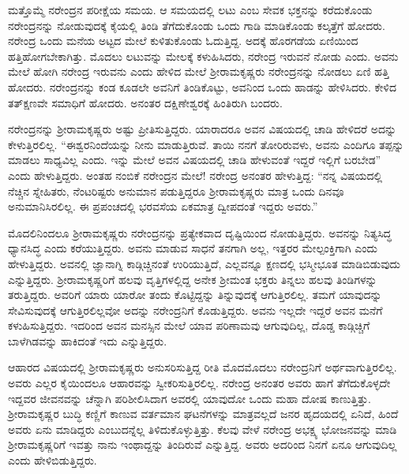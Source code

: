ಮತ್ತೊಮ್ಮೆ ನರೇಂದ್ರನ ಪರೀಕ್ಷೆಯ ಸಮಯ. ಆ ಸಮಯದಲ್ಲಿ ಲಟು ಎಂಬ ಸೇವಕ ಭಕ್ತನನ್ನು ಕರೆದುಕೊಂಡು ನರೇಂದ್ರನನ್ನು ನೋಡುವುದಕ್ಕೆ ಕೈಯಲ್ಲಿ ತಿಂಡಿ ತೆಗೆದುಕೊಂಡು ಒಂದು ಗಾಡಿ ಮಾಡಿಕೊಂಡು ಕಲ್ಕತ್ತೆಗೆ ಹೋದರು. ನರೇಂದ್ರ ಒಂದು ಮನೆಯ ಅಟ್ಟದ ಮೇಲೆ ಕುಳಿತುಕೊಂಡು ಓದುತ್ತಿದ್ದ. ಅದಕ್ಕೆ ಹೊರಗಡೆಯ ಏಣಿಯಿಂದ ಹತ್ತಿಹೋಗಬೇಕಾಗಿತ್ತು. ಮೊದಲು ಲಟುವನ್ನು ಮೇಲಕ್ಕೆ ಕಳುಹಿಸಿದರು, ನರೇಂದ್ರ ಇರುವನೆ ನೋಡು ಎಂದು. ಅವನು ಮೇಲೆ ಹೋಗಿ ನರೇಂದ್ರ ಇರುವನು ಎಂದು ಹೇಳಿದ ಮೇಲೆ ಶ‍್ರೀರಾಮಕೃಷ್ಣರು ನರೇಂದ್ರನನ್ನು ನೋಡಲು ಏಣಿ ಹತ್ತಿ ಹೋದರು. ನರೇಂದ್ರನನ್ನು ಕಂಡ ಕೂಡಲೇ ಅವನಿಗೆ ತಿಂಡಿಕೊಟ್ಟು, ಅವನಿಂದ ಒಂದು ಹಾಡನ್ನು ಹೇಳಿಸಿದರು. ಕೇಳಿದ ತತ್‍ಕ್ಷಣವೇ ಸಮಾಧಿಗೆ ಹೋದರು. ಅನಂತರ ದಕ್ಷಿಣೇಶ್ವರಕ್ಕೆ ಹಿಂತಿರುಗಿ ಬಂದರು.

ನರೇಂದ್ರನನ್ನು ಶ‍್ರೀರಾಮಕೃಷ್ಣರು ಅಷ್ಟು ಪ್ರೀತಿಸುತ್ತಿದ್ದರು. ಯಾರಾದರೂ ಅವನ ವಿಷಯದಲ್ಲಿ ಚಾಡಿ ಹೇಳಿದರೆ ಅದನ್ನು ಕೇಳುತ್ತಿರಲಿಲ್ಲ. “ಈಶ್ವರನಿಂದೆಯನ್ನು ನೀನು ಮಾಡುತ್ತಿರುವೆ. ತಾಯಿ ನನಗೆ ತೋರಿರುವಳು, ಅವನು ಎಂದಿಗೂ ತಪ್ಪನ್ನು ಮಾಡಲು ಸಾಧ್ಯವಿಲ್ಲ ಎಂದು. ಇನ್ನು ಮೇಲೆ ಅವನ ವಿಷಯದಲ್ಲಿ ಚಾಡಿ ಹೇಳುವಂತೆ ಇದ್ದರೆ ಇಲ್ಲಿಗೆ ಬರಬೇಡ” ಎಂದು ಹೇಳುತ್ತಿದ್ದರು. ಅಂತಹ ನಂಬಿಕೆ ನರೇಂದ್ರನ ಮೇಲೆ! ನರೇಂದ್ರ ಅನಂತರ ಹೇಳುತ್ತಿದ್ದ: “ನನ್ನ ವಿಷಯದಲ್ಲಿ ನೆಚ್ಚಿನ ಸ್ನೇಹಿತರು, ನೆಂಟರಿಷ್ಟರು ಅನುಮಾನ ಪಡುತ್ತಿದ್ದರೂ ಶ‍್ರೀರಾಮಕೃಷ್ಣರು ಮಾತ್ರ ಒಂದು ದಿನವೂ ಅನುಮಾನಿಸಿರಲಿಲ್ಲ. ಈ ಪ್ರಪಂಚದಲ್ಲಿ ಭರವಸೆಯ ಏಕಮಾತ್ರ ದ್ವೀಪದಂತೆ ಇದ್ದರು ಅವರು.”

ಮೊದಲಿನಿಂದಲೂ ಶ‍್ರೀರಾಮಕೃಷ್ಣರು ನರೇಂದ್ರನನ್ನು ಪ್ರತ್ಯೇಕವಾದ ದೃಷ್ಟಿಯಿಂದ ನೋಡುತ್ತಿದ್ದರು. ಅವನನ್ನು ನಿತ್ಯಸಿದ್ಧ ಧ್ಯಾನಸಿದ್ಧ ಎಂದು ಕರೆಯುತ್ತಿದ್ದರು. ಅವನು ಮಾಡುವ ಸಾಧನೆ ತನಗಾಗಿ ಅಲ್ಲ, ಇತ್ತರರ ಮೇಲ್ಪಂಕ್ತಿಗಾಗಿ ಎಂದು ಹೇಳುತ್ತಿದ್ದರು. ಅವನಲ್ಲಿ ಜ್ಞಾನಾಗ್ನಿ ಕಾಡ್ಗಿಚ್ಚಿನಂತೆ ಉರಿಯುತ್ತಿದೆ, ಎಲ್ಲವನ್ನೂ ಕ್ಷಣದಲ್ಲಿ ಭಸ್ಮೀಭೂತ ಮಾಡಿಬಿಡುವುದು ಎನ್ನುತ್ತಿದ್ದರು. ಶ‍್ರೀರಾಮಕೃಷ್ಣರಿಗೆ ಹಲವು ವೃತ್ತಿಗಳಲ್ಲಿದ್ದ ಅನೇಕ ಶ‍್ರೀಮಂತ ಭಕ್ತರು ತಿನ್ನಲು ಹಲವು ತಿಂಡಿಗಳನ್ನು ತರುತ್ತಿದ್ದರು. ಅವರಿಗೆ ಯಾರು ಯಾರೋ ತಂದು ಕೊಟ್ಟಿದ್ದನ್ನು ತಿನ್ನುವುದಕ್ಕೆ ಆಗುತ್ತಿರಲಿಲ್ಲ. ತಮಗೆ ಯಾವುದನ್ನು ಸೇವಿಸುವುದಕ್ಕೆ ಆಗುತ್ತಿರಲಿಲ್ಲವೋ ಅದನ್ನು ನರೇಂದ್ರನಿಗೆ ಕೊಡುತ್ತಿದ್ದರು. ಅವನು ಇಲ್ಲದೇ ಇದ್ದರೆ ಅವನ ಮನೆಗೆ ಕಳುಹಿಸುತ್ತಿದ್ದರು. ಇದರಿಂದ ಅವನ ಮನಸ್ಸಿನ ಮೇಲೆ ಯಾವ ಪರಿಣಾಮವು ಆಗುವುದಿಲ್ಲ, ದೊಡ್ಡ ಕಾಡ್ಗಿಚ್ಚಿಗೆ ಬಾಳೆಗಿಡವನ್ನು ಹಾಕಿದಂತೆ ಇದು ಎನ್ನುತ್ತಿದ್ದರು.

ಆಹಾರದ ವಿಷಯದಲ್ಲಿ ಶ‍್ರೀರಾಮಕೃಷ್ಣರು ಅನುಸರಿಸುತ್ತಿದ್ದ ರೀತಿ ಮೊದಮೊದಲು ನರೇಂದ್ರನಿಗೆ ಅರ್ಥವಾಗುತ್ತಿರಲಿಲ್ಲ. ಅವರು ಎಲ್ಲರ ಕೈಯಿಂದಲೂ ಆಹಾರವನ್ನು ಸ್ವೀಕರಿಸುತ್ತಿರಲಿಲ್ಲ. ನರೇಂದ್ರ ಅನಂತರ ಅವರು ಹಾಗೆ ತೆಗೆದುಕೊಳ್ಳದೇ ಇದ್ದವರ ಜೀವನವನ್ನು ಚೆನ್ನಾಗಿ ಪರಿಶೀಲಿಸಿದಾಗ ಅವರಲ್ಲಿ ಯಾವುದೋ ಒಂದು ಮಹಾ ದೋಷ ಕಾಣುತ್ತಿತ್ತು. ಶ‍್ರೀರಾಮಕೃಷ್ಣರ ಬುದ್ಧಿ ಕಣ್ಣಿಗೆ ಕಾಣುವ ವರ್ತಮಾನ ಘಟನೆಗಳನ್ನು ಮಾತ್ರವಲ್ಲದೆ ಜನರ ಹೃದಯದಲ್ಲಿ ಏನಿದೆ, ಹಿಂದೆ ಅವರು ಏನು ಮಾಡಿದ್ದರು ಎಂಬುದನ್ನೆಲ್ಲ ತಿಳಿದುಕೊಳ್ಳುತ್ತಿತ್ತು. ಕೆಲವು ವೇಳೆ ನರೇಂದ್ರ ಅಭಕ್ಷ್ಯ ಭೋಜನವನ್ನು ಮಾಡಿ ಶ‍್ರೀರಾಮಕೃಷ್ಣರಿಗೆ ಇವತ್ತು ನಾನು ಇಂಥಾದ್ದನ್ನು ತಿಂದಿರುವೆ ಎನ್ನುತ್ತಿದ್ದ. ಅವರು ಅದರಿಂದ ನಿನಗೆ ಏನೂ ಆಗುವುದಿಲ್ಲ ಎಂದು ಹೇಳಿಬಿಡುತ್ತಿದ್ದರು.

